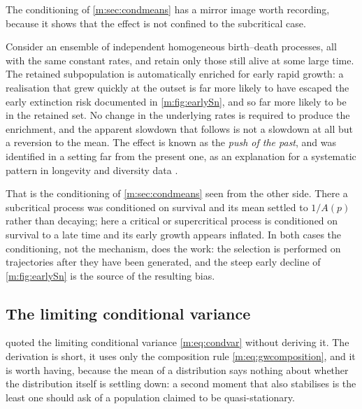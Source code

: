 The conditioning of \cref{m:sec:condmeans} has a mirror image worth recording,
because it shows that the effect is not confined to the subcritical case.

Consider an ensemble of independent homogeneous birth--death processes, all with
the same constant rates, and retain only those still alive at some large time. The
retained subpopulation is automatically enriched for early rapid growth: a
realisation that grew quickly at the outset is far more likely to have escaped the
early extinction risk documented in \cref{m:fig:earlySn}, and so far more likely to
be in the retained set. No change in the underlying rates is required to produce the
enrichment, and the apparent slowdown that follows is not a slowdown at all but a
reversion to the mean. The effect is known as the \emph{push of the past}, and was
identified in a setting far from the present one, as an explanation for a
systematic pattern in longevity and diversity data \cite{Budd2018}.

That is the conditioning of \cref{m:sec:condmeans} seen from the other side. There a
subcritical process was conditioned on survival and its mean settled to $1/A(p)$
rather than decaying; here a critical or supercritical process is conditioned on
survival to a late time and its early growth appears inflated. In both cases the
conditioning, not the mechanism, does the work: the selection is performed on
trajectories after they have been generated, and the steep early decline of
\cref{m:fig:earlySn} is the source of the resulting bias.

\subsection{The limiting conditional variance}
\label{m:app:condvariance}

 quoted the limiting conditional variance
\cref{m:eq:condvar} without deriving it. The derivation is short, it uses only the
composition rule \cref{m:eq:gwcomposition}, and it is worth having, because the mean
of a distribution says nothing about whether the distribution itself is settling
down: a second moment that also stabilises is the least one should ask of a
population claimed to be quasi-stationary.

